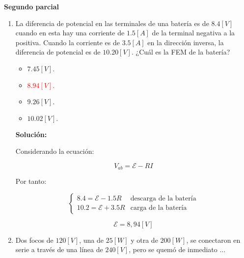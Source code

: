 \documentclass[letter,11pt]{article}
\begin{document}
\begin{center}
    {\Large \bf{Segundo parcial}}
\end{center}

\noindent{}

\vspace{0.5cm}

\begin{enumerate}
\item La diferencia de potencial en las terminales de una batería es de
$8.4 [V]$ cuando en esta hay una corriente de $1.5 [A]$ de la terminal negativa
a la positiva. Cuando la corriente es de $3.5 [A]$ en la dirección inversa, la
diferencia de potencial es de $10.20 [V]$. ¿Cuál es la FEM de la batería?

\begin{itemize}
    \item $ 7.45 [V]$.
    \item \textcolor{red}{$ 8.94 [V]$.}
    \item $ 9.26 [V]$.
    \item $10.02 [V]$.
\end{itemize}

\textbf{Solución:}

Considerando la ecuación:

\begin{equation*}
    V_{ab} = \mathcal{E}-RI
\end{equation*}

Por tanto:

\begin{equation*}
    \begin{cases}
        8.4 = \mathcal{E}-1.5R & \text{descarga de la batería} \\
        10.2 = \mathcal{E}+3.5R & \text{carga de la batería}
    \end{cases}
\end{equation*}

\begin{equation*}
    \mathcal{E} = 8,94 [V]
\end{equation*}

\item Dos focos de $120 [V]$, una de $25 [W]$ y otra de $200 [W]$, se conectaron
en serie a través de una línea de $240 [V]$, pero se quemó de inmediato ...


\end{enumerate}
\end{document}
